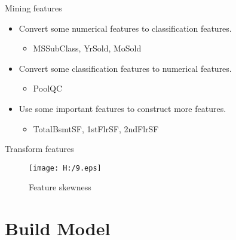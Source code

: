 \documentclass[
 size=14pt,
 paper=smartboard,  %
 mode=present, 		%
 display=slides, 	%
 style=tuliplab,  	%
 pauseslide,
 fleqn,leqno]{powerdot}
\begin{document}
\begin{slide}[toc=,bm=]{Mining features}
  \begin{itemize}
  \item
  Convert some numerical features to classification features.
  \begin{itemize}
  \item
  MSSubClass, YrSold, MoSold
  \end{itemize}

  \item
  Convert some classification features to numerical features.
  \begin{itemize}
  \item
  PoolQC
  \end{itemize}

  \item
  Use some important features to construct more features.
  \begin{itemize}
  \item
  TotalBsmtSF, 1stFlrSF, 2ndFlrSF
  \end{itemize}
  
  \end{itemize}
  
  \end{slide}


\begin{slide}{Transform features}
    
  \begin{figure}
    \texttt{[image: H:/9.eps]}
    \caption{Feature skewness}
    \label{fig:9}
  \end{figure}
  
  \end{slide}


\section{Build Model}
\end{document}
